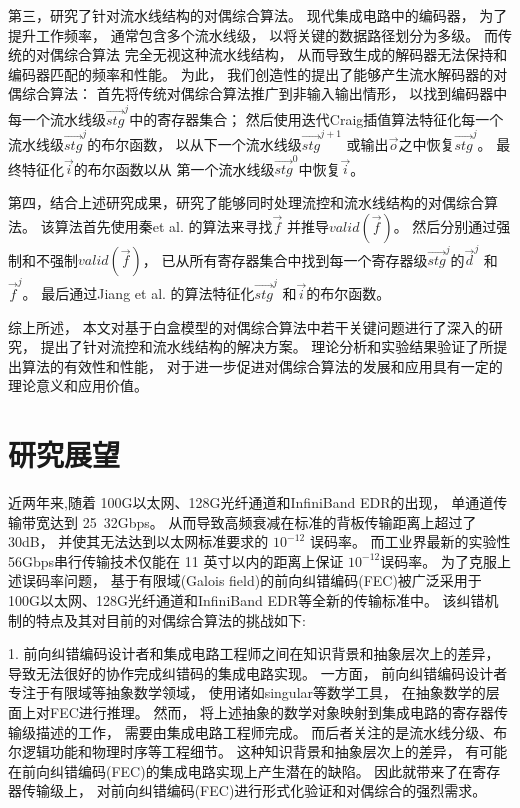 第三，研究了针对流水线结构的对偶综合算法。
现代集成电路中的编码器，
为了提升工作频率，
通常包含多个流水线级，
以将关键的数据路径划分为多级。
而传统的对偶综合算法
完全无视这种流水线结构，
从而导致生成的解码器无法保持和编码器匹配的频率和性能。
为此，
我们创造性的提出了能够产生流水解码器的对偶综合算法：
首先将传统对偶综合算法推广到非输入输出情形，
以找到编码器中每一个流水线级$\vec{stg}^j$中的寄存器集合；
然后使用迭代Craig插值算法特征化每一个流水线级$\vec{stg}^j$的布尔函数，
以从下一个流水线级$\vec{stg}^{j+1}$ 或输出$\vec{o}$之中恢复$\vec{stg}^j$。
最终特征化$\vec{i}$的布尔函数以从
第一个流水线级$\vec{stg}^0$中恢复$\vec{i}$。

第四，结合上述研究成果，研究了能够同时处理流控和流水线结构的对偶综合算法。
该算法首先使用秦et al. 的算法来寻找$\vec{f}$ 并推导$valid(\vec{f})$。
然后分别通过强制和不强制$valid(\vec{f})$，
已从所有寄存器集合中找到每一个寄存器级$\vec{stg}^j$的$\vec{d}^j$ 和$\vec{f}^j$。
最后通过Jiang et al. 的算法特征化$\vec{stg}^j$ 和$\vec{i}$的布尔函数。

综上所述，
本文对基于白盒模型的对偶综合算法中若干关键问题进行了深入的研究，
提出了针对流控和流水线结构的解决方案。
理论分析和实验结果验证了所提出算法的有效性和性能，
对于进一步促进对偶综合算法的发展和应用具有一定的理论意义和应用价值。

\section{研究展望}
近两年来,随着 100G以太网、128G光纤通道和InfiniBand EDR的出现，
单通道传输带宽达到 25~32Gbps。
从而导致高频衰减在标准的背板传输距离上超过了 30dB，
并使其无法达到以太网标准要求的 $10^{-12}$ 误码率。
而工业界最新的实验性 56Gbps串行传输技术仅能在 11 英寸以内的距离上保证 $10^{-12}$误码率。
为了克服上述误码率问题，
基于有限域(Galois field)的前向纠错编码(FEC)被广泛采用于100G以太网、128G光纤通道和InfiniBand EDR等全新的传输标准中。
该纠错机制的特点及其对目前的对偶综合算法的挑战如下:

1. 前向纠错编码设计者和集成电路工程师之间在知识背景和抽象层次上的差异，
导致无法很好的协作完成纠错码的集成电路实现。
一方面，
前向纠错编码设计者专注于有限域等抽象数学领域，
使用诸如singular等数学工具，
在抽象数学的层面上对FEC进行推理。
然而，
将上述抽象的数学对象映射到集成电路的寄存器传输级描述的工作，
需要由集成电路工程师完成。
而后者关注的是流水线分级、布尔逻辑功能和物理时序等工程细节。
这种知识背景和抽象层次上的差异，
有可能在前向纠错编码(FEC)的集成电路实现上产生潜在的缺陷。
因此就带来了在寄存器传输级上，
对前向纠错编码(FEC)进行形式化验证和对偶综合的强烈需求。

